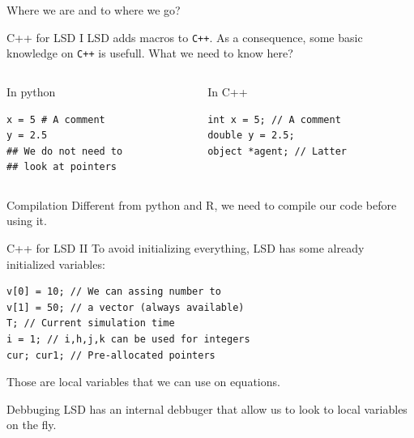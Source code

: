 \documentclass[bigger,aspectratio=169]{beamer}
\begin{document}
\begin{frame}[label={sec:orgb9d624d}]{Where we are and to where we go?}
\end{frame}

\begin{frame}[label={sec:org0040fb1},fragile]{C++ for LSD I}
 LSD adds macros to \texttt{C++}.
As a consequence, some basic knowledge on \texttt{C++} is usefull.
What we need to know here?
\begin{columns}
\begin{column}{0.4\columnwidth}
\begin{block}{In python}
\begin{verbatim}
x = 5 # A comment
y = 2.5
## We do not need to
## look at pointers
\end{verbatim}
\end{block}
\end{column}
\begin{column}{0.4\columnwidth}
\begin{block}{In C++}
\begin{verbatim}
int x = 5; // A comment
double y = 2.5;
object *agent; // Latter
\end{verbatim}
\end{block}
\end{column}
\end{columns}
\begin{block}{Compilation}
Different from python and R, we need to \alert{compile} our code before using it.
\end{block}
\end{frame}
\begin{frame}[label={sec:org2a3cbc0},fragile]{C++ for LSD II}
 To avoid initializing everything, LSD has some already initialized variables:

\begin{verbatim}
v[0] = 10; // We can assing number to
v[1] = 50; // a vector (always available)
T; // Current simulation time
i = 1; // i,h,j,k can be used for integers
cur; cur1; // Pre-allocated pointers
\end{verbatim}

Those are \alert{local variables} that we can use on equations.
\begin{block}{Debbuging}
LSD has an internal debbuger that allow us to look to local variables on the fly.
\end{block}
\end{frame}
\end{document}
